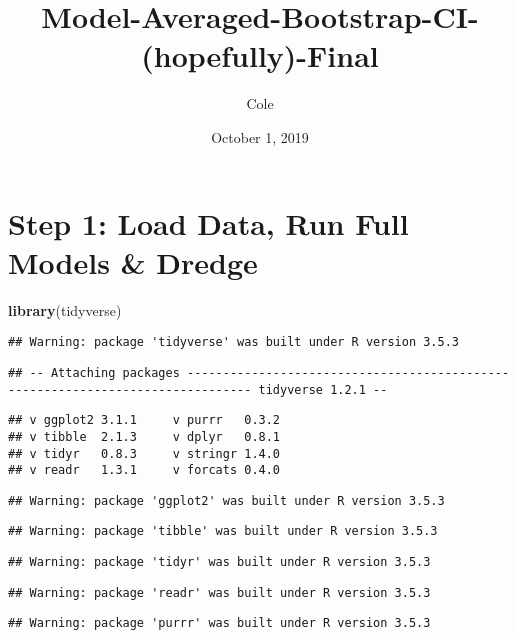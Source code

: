 \documentclass[]{article}
\title{Model-Averaged-Bootstrap-CI-(hopefully)-Final}
\author{Cole}
\date{October 1, 2019}
\newenvironment{Shaded}{\begin{snugshade}}{\end{snugshade}}
\newcommand{\KeywordTok}[1]{\textcolor[rgb]{0.13,0.29,0.53}{\textbf{#1}}}
\newcommand{\NormalTok}[1]{#1}
\begin{document}
\maketitle

\section{Step 1: Load Data, Run Full Models \&
Dredge}\label{step-1-load-data-run-full-models-dredge}

\begin{Shaded}
\begin{Highlighting}[]
\KeywordTok{library}\NormalTok{(tidyverse)}
\end{Highlighting}
\end{Shaded}

\begin{verbatim}
## Warning: package 'tidyverse' was built under R version 3.5.3
\end{verbatim}

\begin{verbatim}
## -- Attaching packages ------------------------------------------------------------------------------- tidyverse 1.2.1 --
\end{verbatim}

\begin{verbatim}
## v ggplot2 3.1.1     v purrr   0.3.2
## v tibble  2.1.3     v dplyr   0.8.1
## v tidyr   0.8.3     v stringr 1.4.0
## v readr   1.3.1     v forcats 0.4.0
\end{verbatim}

\begin{verbatim}
## Warning: package 'ggplot2' was built under R version 3.5.3
\end{verbatim}

\begin{verbatim}
## Warning: package 'tibble' was built under R version 3.5.3
\end{verbatim}

\begin{verbatim}
## Warning: package 'tidyr' was built under R version 3.5.3
\end{verbatim}

\begin{verbatim}
## Warning: package 'readr' was built under R version 3.5.3
\end{verbatim}

\begin{verbatim}
## Warning: package 'purrr' was built under R version 3.5.3
\end{verbatim}
\end{document}
